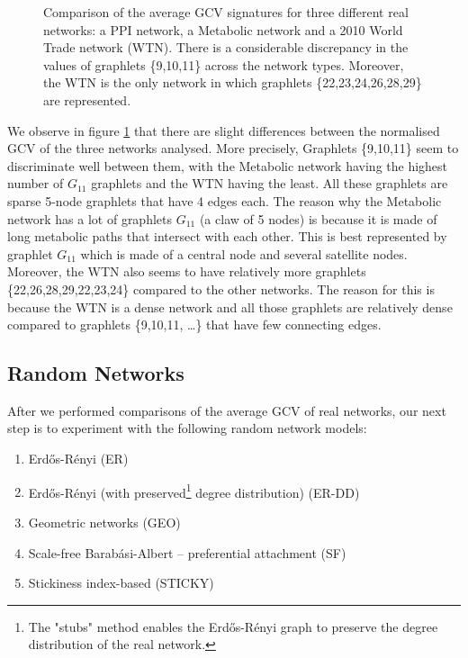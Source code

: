 \begin{figure}[h]
  \caption[Average GCV signatures for PPI, Metabolic and World Trade network]{Comparison of the average GCV signatures for three different
  real networks: a PPI network, a Metabolic network and 
  a 2010 World Trade network (WTN). There is a considerable discrepancy in the values of graphlets \{9,10,11\} across the network types. Moreover, the WTN is the only network in which graphlets \{22,23,24,26,28,29\} are represented.}
  \label{fig:avg_gdv_real}
\end{figure}

We observe in figure \ref{fig:avg_gdv_real} that there are slight differences between the normalised GCV of the three networks analysed. More precisely,
Graphlets \{9,10,11\} seem to discriminate well between them, with the Metabolic network having the highest number of $ G_{11}$ graphlets and the WTN having the least. All these graphlets are sparse 5-node graphlets that have 4 edges each. The reason why the Metabolic network has a lot of graphlets $G_{11}$ (a claw of 5 nodes) is because it is made of long metabolic paths that intersect with each other. This is best represented by graphlet $G_{11}$ which is made of a central node and several satellite nodes. Moreover, the WTN also seems to have relatively more graphlets \{22,26,28,29,22,23,24\} compared to the other networks. The reason for this is because the WTN is a dense network and all those graphlets are relatively dense compared to graphlets \{9,10,11, \dots \} that have few connecting edges.

\subsection{Random Networks}
\label{sec:initial_experiments_rnd_nets}

After we performed comparisons of the average GCV of real networks, our
next step is to experiment with the following random network models:
\begin{enumerate}
  \item Erd\H{o}s-R\'{e}nyi \cite{erdHos1959random} (ER)
  \item Erd\H{o}s-R\'{e}nyi (with preserved\footnote{The "stubs" method enables the Erd\H{o}s-R\'{e}nyi graph to preserve the degree distribution of the real network.} degree distribution) (ER-DD)
  \item Geometric networks \cite{penrose2003random} (GEO)
  \item Scale-free Barab\'{a}si-Albert -- preferential attachment \cite{barabasi1999emergence} (SF)
  \item Stickiness index-based \cite{prvzulj2006modelling} (STICKY)
\end{enumerate}


